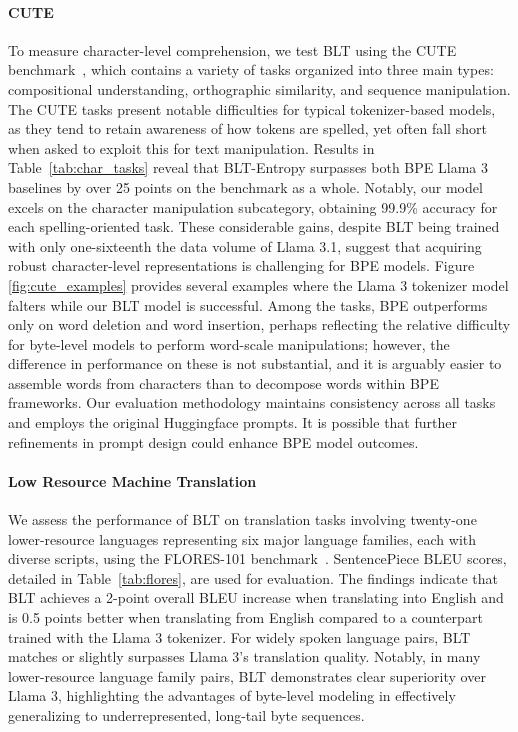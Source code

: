 \paragraph{CUTE}
To measure character-level comprehension, we test {\textsc BLT} using the CUTE benchmark~\citep{edman2024cute}, which contains a variety of tasks organized into three main types: compositional understanding, orthographic similarity, and sequence manipulation. The CUTE tasks present notable difficulties for typical tokenizer-based models, as they tend to retain awareness of how tokens are spelled, yet often fall short when asked to exploit this for text manipulation. Results in Table~\ref{tab:char_tasks} reveal that {\textsc BLT}-Entropy surpasses both BPE Llama 3 baselines by over 25 points on the benchmark as a whole. Notably, our model excels on the character manipulation subcategory, obtaining 99.9\% accuracy for each spelling-oriented task. These considerable gains, despite {\textsc BLT} being trained with only one-sixteenth the data volume of Llama 3.1, suggest that acquiring robust character-level representations is challenging for BPE models. Figure \ref{fig:cute_examples} provides several examples where the Llama 3 tokenizer model falters while our {\textsc BLT} model is successful. Among the tasks, BPE outperforms only on word deletion and word insertion, perhaps reflecting the relative difficulty for byte-level models to perform word-scale manipulations; however, the difference in performance on these is not substantial, and it is arguably easier to assemble words from characters than to decompose words within BPE frameworks. Our evaluation methodology maintains consistency across all tasks and employs the original Huggingface prompts. It is possible that further refinements in prompt design could enhance BPE model outcomes.

\paragraph{Low Resource Machine Translation} We assess the performance of {\textsc BLT} on translation tasks involving twenty-one lower-resource languages representing six major language families, each with diverse scripts, using the FLORES-101 benchmark~\citep{goyal2022flores}. SentencePiece BLEU scores, detailed in Table~\ref{tab:flores}, are used for evaluation.
The findings indicate that {\textsc BLT} achieves a 2-point overall BLEU increase when translating into English and is 0.5 points better when translating from English compared to a counterpart trained with the Llama 3 tokenizer. For widely spoken language pairs, {\textsc BLT} matches or slightly surpasses Llama 3's translation quality. Notably, in many lower-resource language family pairs, {\textsc BLT} demonstrates clear superiority over Llama 3, highlighting the advantages of byte-level modeling in effectively generalizing to underrepresented, long-tail byte sequences.

